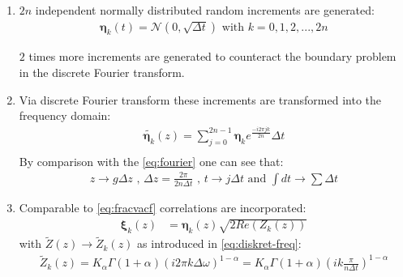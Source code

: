 \documentclass[
  a4paper,BCOR10mm,oneside,
  bibtotoc,idxtotoc,
  headsepline,footsepline,%
  fleqn,openbib
]{scrbook}
\begin{document}
\begin{enumerate}
 \item $2 n$ independent normally distributed random increments are generated: 
\begin{align}
 \bm{\eta}_k(t)= \bm{\mathcal{N}}(0,\sqrt{\Delta t}) \text{  with  } k=0,1,2,...,2n
\end{align}

$2$ times more increments are generated to counteract the boundary problem in the discrete Fourier transform. 

\item Via discrete Fourier transform these increments are transformed into the frequency domain:
\begin{align}
 \tilde{\bm{\eta}_k}(z)=\sum_{j=0}^{2n-1} \bm{\eta}_k e^{\frac{- i 2 \pi  j k }{2n}} \Delta t  \label{eq:fouriertrans}\\ 
\end{align}
By comparison with the \cref{eq:fourier} one can see that:
\begin{align}
 z \rightarrow  g \Delta z \text{ , } \Delta z =   \frac{2 \pi }{2n \Delta t} \text{ , } t \rightarrow j \Delta t \text{ and } \int dt \rightarrow \sum \Delta t \label{eq:diskret-freq} 
\end{align}
 
\item Comparable to \cref{eq:fracvacf} correlations are incorporated: 
 \begin{align}
  \bm{\xi}_{k}(z)&=\bm{\eta}_k(z) \sqrt{2 Re(Z_k(z))} \label{eq:corelastion} 
  \end{align}
 with $\tilde{Z}(z)\rightarrow \tilde{Z}_k(z)$ as introduced in \cref{eq:diskret-freq}:
  \begin{align}
   \tilde{Z}_k(z) = K_{\alpha} \Gamma(1+\alpha)(i 2 \pi k \Delta \omega)^{1-\alpha} =  K_{\alpha} \Gamma(1+\alpha)(i k \frac{ \pi}{n \Delta t})^{1-\alpha} 
 \end{align}
 

\end{enumerate}
\end{document}
